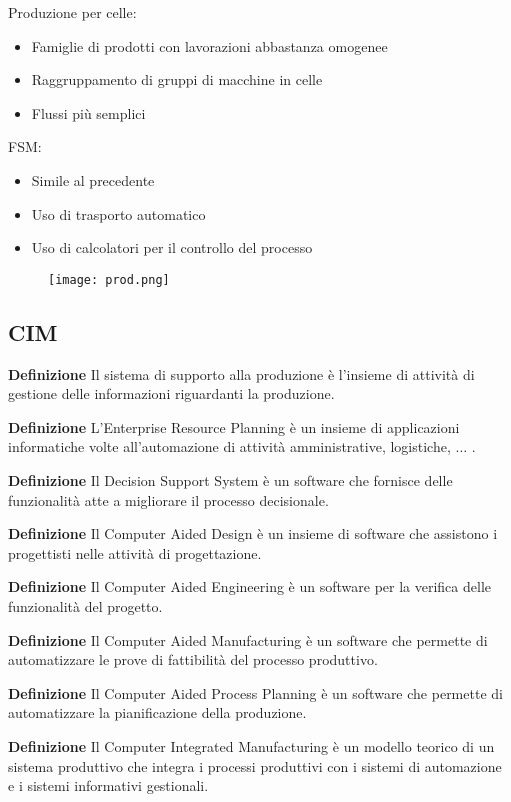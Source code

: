 \documentclass{article}
\newcommand{\df}[1]{\noindent\textbf{Definizione } #1.\newline}
\begin{document}
\noindent Produzione per celle:
\begin{itemize}
    \item Famiglie di prodotti con lavorazioni abbastanza omogenee
    \item Raggruppamento di gruppi di macchine in celle
    \item Flussi più semplici\newline
\end{itemize}

\noindent FSM:
\begin{itemize}
    \item Simile al precedente
    \item Uso di trasporto automatico
    \item Uso di calcolatori per il controllo del processo\newline
\end{itemize}

\begin{figure}[ht]
    \centering
    \texttt{[image: prod.png]}
\end{figure}

\newpage

\subsection{CIM}

\df{Il sistema di supporto alla produzione è l'insieme di attività di gestione delle informazioni riguardanti la produzione}

\df{L'Enterprise Resource Planning è un insieme di applicazioni informatiche volte all'automazione di attività amministrative, logistiche, $\ldots$ }

\df{Il Decision Support System è un software che fornisce delle funzionalità atte a migliorare il processo decisionale}

\df{Il Computer Aided Design è un insieme di software che assistono i progettisti nelle attività di progettazione}

\df{Il Computer Aided Engineering è un software per la verifica delle funzionalità del progetto}

\df{Il Computer Aided Manufacturing è un software che permette di automatizzare le prove di fattibilità del processo produttivo}

\df{Il Computer Aided Process Planning è un software che permette di automatizzare la pianificazione della produzione}

\df{Il Computer Integrated Manufacturing è un modello teorico di un sistema produttivo che integra i processi produttivi con i sistemi di automazione e i sistemi informativi gestionali}
\end{document}
